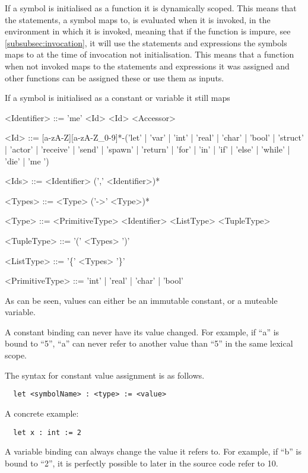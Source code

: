 If a symbol is initialised as a function it is dynamically scoped. This means that the statements, a symbol maps to, is evaluated when it is invoked, in the environment in which it is invoked, meaning that if the function is impure, see \cref{subsubsec:invocation}, it will use the statements and expressions the symbols maps to at the time of invocation not initialisation. This means that a function when not invoked maps to the statements and expressions it was assigned and other functions can be assigned these or use them as inputs.

If a symbol is initialised as a constant or variable it still maps

\begin{grammar}
<Identifier> ::= 'me'
 \alt <Id>
 \alt <Id> <Accessor>

<Id> ::= [a-zA-Z][a-zA-Z\_0-9]*-('let' | 'var' | 'int' | 'real' | 'char' | 'bool' | 'struct' | 'actor' | 'receive' | 'send' | 'spawn' | 'return' | 'for' | 'in' | 'if' | 'else' | 'while' | 'die' | 'me ')

<Ids> ::= <Identifier> (',' <Identifier>)*

<Types> ::= <Type> ('->' <Type>)*

<Type> ::= <PrimitiveType>
 \alt <Identifier>
 \alt <ListType>
 \alt <TupleType>

<TupleType> ::= '(' <Types> ')'

<ListType> ::= '\{' <Types> '\}'

<PrimitiveType> ::= 'int' | 'real' | 'char' | 'bool'
\end{grammar}

As can be seen, values can either be an immutable constant, or a muteable variable.

A constant binding can never have its value changed. For example, if \enquote{a} is bound to \enquote{5}, \enquote{a} can never refer to another value than \enquote{5} in the same lexical scope. 

The syntax for constant value assignment is as follows.
\begin{verbatim}
  let <symbolName> : <type> := <value>
\end{verbatim}
A concrete example:

\begin{verbatim}
  let x : int := 2
\end{verbatim}

A variable binding can always change the value it refers to. For example, if \enquote{b} is bound to \enquote{2}, it is perfectly possible to later in the source code refer to {10}.

